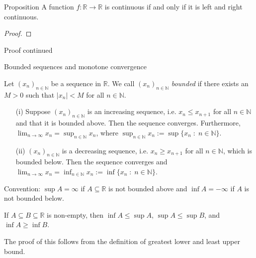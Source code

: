 \documentclass [aspectratio=169]{beamer}
\newcommand{\R}{{\mathbb{R}}}
\newcommand{\N}{{\mathbb{N}}}
\begin{document}
\begin{frame}
\begin{exampleblock}{Proposition}
 A function $f\colon \R \to \R$ is continuous if and only if it is left and right continuous. 
\end{exampleblock}
\begin{proof}
\vspace{5cm}
\end{proof}
\end{frame}


\begin{frame}
\begin{block}{Proof continued}
\vspace{4.5cm}
\end{block}
\end{frame}


\begin{frame}{Bounded sequences and monotone convergence}
\begin{definition}
Let $(x_n)_{n\in \N}$ be a sequence in $\R$. We call $(x_n)_{n\in \N}$ \emph{bounded} if there exists an $M > 0$ such that $\vert x_n\vert<M$ for all $n\in \N$.
\end{definition}

\vspace{0.5em}

\begin{theorem}
\begin{itemize}
\item[(i)] Suppose $(x_n)_{n\in \N}$ is an increasing sequence, i.e. $x_n\leq x_{n+1}$ for all $n\in \N$ and that it is bounded above. Then the sequence converges. Furthermore, $\lim_{n\to \infty} x_n = \sup_{n\in \N} x_n$, where $\sup_{n\in \N} x_n := \sup\{x_n \; \colon \; n\in \N\}$.
\item[(ii)] $(x_n)_{n\in \N}$ is a decreasing sequence, i.e. $x_n\geq x_{n+1}$ for all $n\in \N$, which is bounded below. Then the sequence converges and $\lim_{n\to \infty} x_n = \inf_{n\in \N} x_n := \inf\{x_n \; \colon \; n\in \N\}$. 
\end{itemize}
\end{theorem}

\end{frame}


\begin{frame}
Convention: $\sup A = \infty$ if $A\subseteq \R$ is not bounded above and $\inf A= -\infty$ if $A$ is not bounded below.

\begin{lemma}
If $A \subseteq B \subseteq \R$ is non-empty, then $\inf A \leq \sup A$, $\sup A \leq \sup B$, and $\inf A \geq \inf B$.
\end{lemma}
The proof of this follows from the definition of greatest lower and least upper bound. 

\end{frame}
\end{document}
